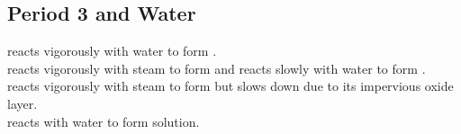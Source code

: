 \documentclass[../main]{subfiles}
\begin{document}
	\subsection{Period 3 and Water}

	 reacts vigorously with water to form . \\
	 reacts vigorously with steam to form  and reacts slowly with water to form . \\
	 reacts vigorously with steam to form  but slows down due to its impervious oxide layer. \\
	 reacts with water to form  solution. \\


\end{document}
